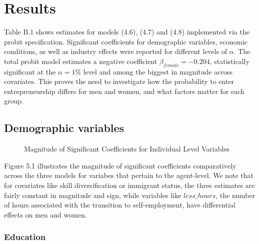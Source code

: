 \chapter{Results\label{ch:results}}

Table B.1 shows estimates for models (4.6), (4.7) and (4.8) implemented via the probit specification. Significant coefficients for demographic variables, economic conditions, as well as industry effects were reported for different levels of $\alpha$. The total probit model estimates a negative coefficient $\beta_{female} = -0.204$, statistically significant at the $\alpha = 1\%$ level and among the biggest in magnitude across covariates. This proves the need to investigate how the probability to enter entrepreneurship differs for men and women, and what factors matter for each group.

\section{Demographic variables}

\begin{figure}[hbtp]
    \caption{Magnitude of Significant Coefficients for Individual Level Variables} 
\end{figure}

Figure 5.1 illustrates the magnitude of significant coefficients comparatively across the three models for variabes that pertain to the agent-level. We note that for covariates like skill diversification or immigrant status, the three estimates are fairly constant in magnitude and sign, while variables like $less\_hours$, the number of hours associated with the transition to self-employment, have differential effects on men and women. 

\subsection{Education}

